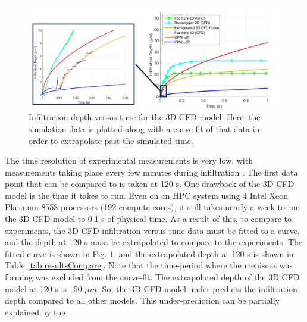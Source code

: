 \documentclass[%
 aip,
 amsmath,amssymb,
 reprint,%
floatfix]{revtex4-1}
\begin{document}
\begin{figure}
    \centering
    \includegraphics[width=\linewidth]{Figures/3D_results.png}
    \caption{Infiltration depth versus time for the 3D CFD model. Here, the simulation data is plotted along with a curve-fit of that data in order to extrapolate past the simulated time.}
    \label{fig:3D_results}
\end{figure}

The time resolution of experimental measurements is very low, with measurements taking place every few minutes during infiltration \cite{Naraparaju2017}. The first data point that can be compared to is taken at 120 s. One drawback of the 3D CFD model is the time it takes to run. Even on an HPC system using 4 Intel Xeon Platinum 8558 processors (192 compute cores), it still takes nearly a week to run the 3D CFD model to 0.1 s of physical time. As a result of this, to compare to experiments, the 3D CFD infiltration versus time data must be fitted to a curve, and the depth at 120 s must be extrapolated to compare to the experiments. The fitted curve is shown in Fig. \ref{fig:3D_results}, and the extrapolated depth at 120 s is shown in Table \ref{tab:resultsCompare}. Note that the time-period where the meniscus was forming was excluded from the curve-fit. The extrapolated depth of the 3D CFD model at 120 s is ~50 $\mu m$. So, the 3D CFD model under-predicts the infiltration depth compared to all other models. This under-prediction can be partially explained by the 
\end{document}
